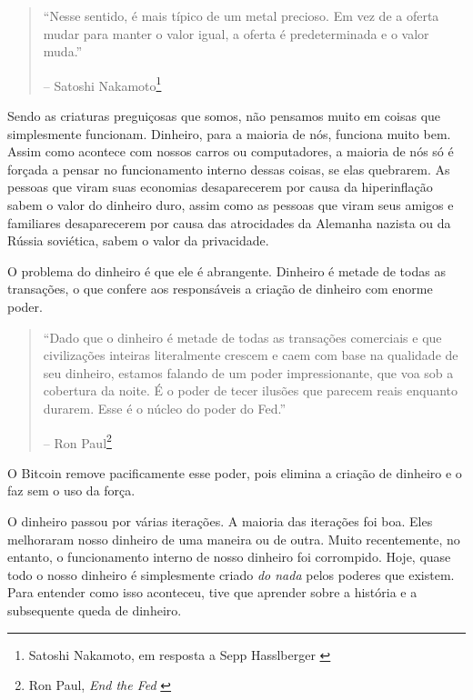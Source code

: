 \begin{quotation}\begin{samepage}
\enquote{Nesse sentido, é mais típico de um metal precioso. Em vez de a 
oferta mudar para manter o valor igual, a oferta é predeterminada e o valor muda.}
\begin{flushright} -- Satoshi Nakamoto\footnote{Satoshi Nakamoto, em resposta a Sepp
Hasslberger \cite{satoshi-precious-metal}}
\end{flushright}\end{samepage}\end{quotation}

Sendo as criaturas preguiçosas que somos, não pensamos muito em coisas que simplesmente 
funcionam. Dinheiro, para a maioria de nós, funciona muito bem. Assim como acontece com 
nossos carros ou computadores, a maioria de nós só é forçada a pensar no funcionamento interno 
dessas coisas, se elas quebrarem. As pessoas que viram suas economias desaparecerem por causa 
da hiperinflação sabem o valor do dinheiro duro, assim como as pessoas que viram seus amigos e 
familiares desaparecerem por causa das atrocidades da Alemanha nazista ou da Rússia soviética,
sabem o valor da privacidade.

O problema do dinheiro é que ele é abrangente. Dinheiro é metade de todas as transações, 
o que confere aos responsáveis a criação de dinheiro com enorme poder.

\begin{quotation}\begin{samepage}
\enquote{Dado que o dinheiro é metade de todas as transações comerciais e que civilizações 
inteiras literalmente crescem e caem com base na qualidade de seu dinheiro, estamos falando 
de um poder impressionante, que voa sob a cobertura da noite. É o poder de tecer ilusões que 
parecem reais enquanto durarem. Esse é o núcleo do poder do Fed.}
\begin{flushright} -- Ron Paul\footnote{Ron Paul, \textit{End the Fed} \cite{end-the-fed}}
\end{flushright}\end{samepage}\end{quotation}

O Bitcoin remove pacificamente esse poder, pois elimina a criação de dinheiro e o faz sem o 
uso da força.

O dinheiro passou por várias iterações. A maioria das iterações foi boa. Eles melhoraram nosso 
dinheiro de uma maneira ou de outra. Muito recentemente, no entanto, o funcionamento interno de 
nosso dinheiro foi corrompido. Hoje, quase todo o nosso dinheiro é simplesmente criado \textit{do nada} 
pelos poderes que existem. Para entender como isso aconteceu, tive que aprender sobre a história e a 
subsequente queda de dinheiro.

